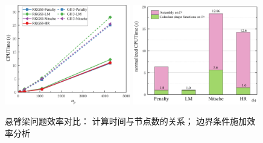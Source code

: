 \begin{figure}[H]
\centering
    \begin{subcaptiongroup}
        \includegraphics[width=0.49\textwidth]{figure/EHR/cantilever/cputime.png}
        \label{Ccputime}
        \includegraphics[width=0.49\textwidth]{figure/EHR/cantilever/efficiency.png}
        \label{Cefficiency}
        \end{subcaptiongroup}
\caption{悬臂梁问题效率对比： 计算时间与节点数的关系； 边界条件施加效率分析}
\end{figure}
